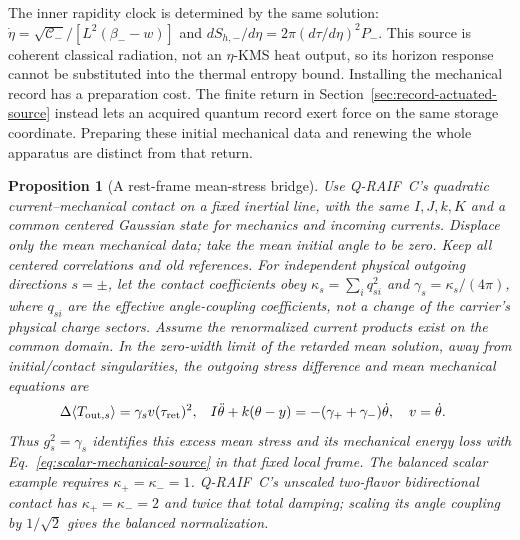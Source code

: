 \documentclass[12pt,a4paper]{article}
\newtheorem{proposition}[theorem]{Proposition}
\begin{document}
The inner rapidity clock is determined by the same solution:
$\dot\eta=\sqrt{\mathcal C_-}/[L^2(\beta_--w)]$ and
$dS_{h,-}/d\eta=2\pi(d\tau/d\eta)^2P_-$.
This source is coherent classical radiation, not an $\eta$-KMS heat
output, so its horizon response cannot be substituted into the thermal
entropy bound. Installing the mechanical record has a preparation cost.
The finite return in Section~\ref{sec:record-actuated-source} instead lets
an acquired quantum record exert force on the same storage coordinate.
Preparing these initial mechanical data and renewing the whole apparatus
are distinct from that return.

\begin{proposition}[A rest-frame mean-stress bridge]
\label{prop:inertial-mean-bridge}
Use Q-RAIF~C's quadratic current--mechanical contact on a fixed inertial
line, with the same $I,J,k,K$ and a common centered Gaussian state for
mechanics and incoming currents. Displace only the mean mechanical data;
take the mean initial angle to be zero. Keep all centered correlations
and old references. For independent physical outgoing directions
$s=\pm$, let the contact coefficients obey
$\kappa_s=\sum_i q_{si}^2$ and $\gamma_s=\kappa_s/(4\pi)$, where
$q_{si}$ are the effective angle-coupling coefficients, not a change
of the carrier's physical charge sectors.
Assume the renormalized current products exist on the common domain.
In the zero-width limit of the retarded mean solution, away from
initial/contact singularities, the outgoing stress difference and mean
mechanical equations are
\begin{align}
 \Delta\langle T_{{\rm out},s}\rangle
    &=\gamma_s v(\tau_{\rm ret})^2, &
 I\ddot\theta+k(\theta-y)&=-(\gamma_++\gamma_-)\dot\theta,
 \quad v=\dot\theta. \label{eq:mean-contact-bridge}
\end{align}
Thus $g_s^2=\gamma_s$ identifies this excess mean stress and its
mechanical energy loss with Eq.~\eqref{eq:scalar-mechanical-source}
in that fixed local frame. The balanced scalar example requires
$\kappa_+=\kappa_-=1$. Q-RAIF~C's unscaled two-flavor bidirectional
contact has $\kappa_+=\kappa_-=2$ and twice that total damping;
scaling its angle coupling by $1/\sqrt2$ gives the balanced normalization.
\end{proposition}
\end{document}
